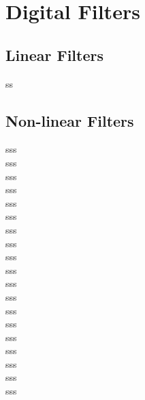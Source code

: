 \section{Digital Filters}
\subsection{Linear Filters}
ss
\subsection{Non-linear Filters}
sss\\
sss\\
sss\\
sss\\
sss\\
sss\\
sss\\
sss\\
sss\\
sss\\
sss\\
sss\\
sss\\
sss\\
sss\\
sss\\
sss\\
sss\\
sss\\
